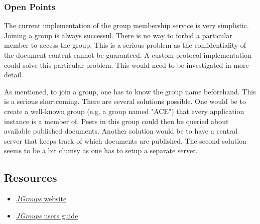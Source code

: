 \subsubsection{Open Points}
The current implementation of the group membership service is very simplistic. Joining a group is always successul. There is no way to forbid a particular member to access the group. This is a serious problem as the confidentiality of the document content cannot be guaranteed. A custom protocol implementation could solve this particular problem. This would need to be investigated in more detail.

As mentioned, to join a group, one has to know the group name beforehand. This is a serious shortcoming. There are several solutions possible. One would be to create a well-known group (e.g. a group named "ACE") that every application instance is a member of. Peers in this group could then be queried about available published documents. Another solution would be to have a central server that keeps track of which documents are published. The second solution seems to be a bit clumsy as one has to setup a separate server.


\subsection{Resources}
\begin{itemize}
 \item \href{http://www.jgroups.org/javagroupsnew/docs/index.html}{\emph{JGroups} website}
 \item \href{http://www.jgroups.org/javagroupsnew/docs/newuser/index.html}{\emph{JGroups} users guide}
\end{itemize}
